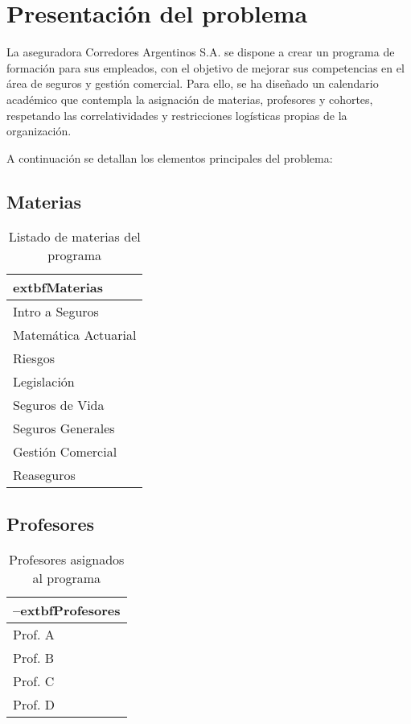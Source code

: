 \section{Presentación del problema}
La aseguradora Corredores Argentinos S.A. se dispone a crear un programa de formación para sus empleados, con el objetivo de mejorar sus competencias en el área de seguros y gestión comercial. Para ello, se ha diseñado un calendario académico que contempla la asignación de materias, profesores y cohortes, respetando las correlatividades y restricciones logísticas propias de la organización.

A continuación se detallan los elementos principales del problema:

\subsection*{Materias}
\begin{table}[ht]
\centering
\begin{tabular}{|l|}
\hline
	extbf{Materias} \\
\hline
Intro a Seguros \\
Matemática Actuarial \\
Riesgos \\
Legislación \\
Seguros de Vida \\
Seguros Generales \\
Gestión Comercial \\
Reaseguros \\
\hline
\end{tabular}
\caption{Listado de materias del programa}
\end{table}

\subsection*{Profesores}
\begin{table}[ht]
\centering
\begin{tabular}{|l|}
\hline
	–extbf{Profesores} \\
\hline
Prof. A \\
Prof. B \\
Prof. C \\
Prof. D \\
\hline
\end{tabular}
\caption{Profesores asignados al programa}
\end{table}

